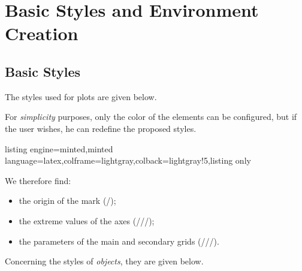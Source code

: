 \documentclass[11pt,a4paper]{ltxdoc}
\begin{document}
\newpage

\section{Basic Styles and Environment Creation}

\subsection{Basic Styles}

The styles used for plots are given below.

\smallskip

For \textit{simplicity} purposes, only the color of the elements can be configured, but if the user wishes, he can redefine the proposed styles.

\begin{tcblisting}{listing engine=minted,minted language=latex,colframe=lightgray,colback=lightgray!5,listing only}
\tikzset{
	Xmin/.store in=\pflxmin,Xmin/.default=-3,Xmin=-3,
	Xmax/.store in=\pflxmax,Xmax/.default=3,Xmax=3,
	Ymin/.store in=\pflymin,Ymin/.default=-3,Ymin=-3,
	Ymax/.store in=\pflymax,Ymax/.default=3,Ymax=3,
	Origx/.store in=\pflOx,Origx/.default=0,Origx=0,
	Origy/.store in=\pflOy,Origy/.default=0,Origy=0,
	Xgrid/.store in=\pflgrillex,Xgrid/.default=1,Xgrid=1,
	Xgrids/.store in=\pflgrillexs,Xgrids/.default=0.5,Xgrids=0.5,
	Ygrid/.store in=\pflgrilley,Ygrid/.default=1,Ygrid=1,
	Ygrids/.store in=\pflgrilleys,Ygrids/.default=0.5,Ygrids=0.5
}
\end{tcblisting}

We therefore find:

\smallskip

\begin{itemize}
	\item the origin of the mark (/);
	\item the extreme values of the axes (///);
	\item the parameters of the main and secondary grids (///).
\end{itemize}

\smallskip

Concerning the styles of \textit{objects}, they are given below.
\end{document}
